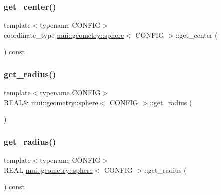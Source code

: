 \subsubsection{\texorpdfstring{get\+\_\+center()}{get\_center()}\hspace{0.1cm}{\footnotesize\ttfamily [2/2]}}
{\footnotesize\ttfamily template$<$typename C\+O\+N\+F\+IG$>$ \\
coordinate\+\_\+type \hyperlink{classmui_1_1geometry_1_1sphere}{mui\+::geometry\+::sphere}$<$ C\+O\+N\+F\+IG $>$\+::get\+\_\+center (\begin{DoxyParamCaption}{ }\end{DoxyParamCaption}) const\hspace{0.3cm}{\ttfamily [inline]}}

\mbox{\label{classmui_1_1geometry_1_1sphere_a2a3c043438da3e2c69ebe300f2865419}} 
\subsubsection{\texorpdfstring{get\+\_\+radius()}{get\_radius()}\hspace{0.1cm}{\footnotesize\ttfamily [1/2]}}
{\footnotesize\ttfamily template$<$typename C\+O\+N\+F\+IG$>$ \\
R\+E\+AL\& \hyperlink{classmui_1_1geometry_1_1sphere}{mui\+::geometry\+::sphere}$<$ C\+O\+N\+F\+IG $>$\+::get\+\_\+radius (\begin{DoxyParamCaption}{ }\end{DoxyParamCaption})\hspace{0.3cm}{\ttfamily [inline]}}

\mbox{\label{classmui_1_1geometry_1_1sphere_aacde4471508b9478f5513f45326a8c3b}} 
\subsubsection{\texorpdfstring{get\+\_\+radius()}{get\_radius()}\hspace{0.1cm}{\footnotesize\ttfamily [2/2]}}
{\footnotesize\ttfamily template$<$typename C\+O\+N\+F\+IG$>$ \\
R\+E\+AL \hyperlink{classmui_1_1geometry_1_1sphere}{mui\+::geometry\+::sphere}$<$ C\+O\+N\+F\+IG $>$\+::get\+\_\+radius (\begin{DoxyParamCaption}{ }\end{DoxyParamCaption}) const\hspace{0.3cm}{\ttfamily [inline]}}

